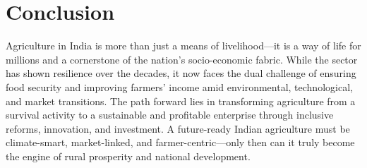 \section{Conclusion}

Agriculture in India is more than just a means of livelihood—it is a way of life for millions and a cornerstone of the nation’s socio-economic fabric. While the sector has shown resilience over the decades, it now faces the dual challenge of ensuring food security and improving farmers’ income amid environmental, technological, and market transitions. The path forward lies in transforming agriculture from a survival activity to a sustainable and profitable enterprise through inclusive reforms, innovation, and investment. A future-ready Indian agriculture must be climate-smart, market-linked, and farmer-centric—only then can it truly become the engine of rural prosperity and national development.
